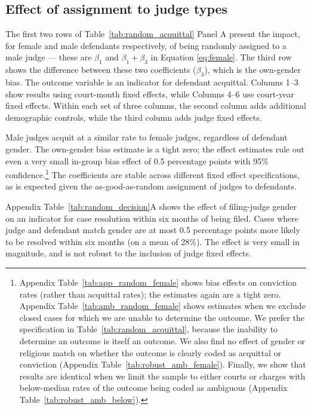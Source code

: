 \documentclass[12pt,english]{article}
\begin{document}
\subsection{Effect of assignment to judge types}

The first two rows of Table~\ref{tab:random_acquittal} Panel A present the impact, for female and male defendants respectively, of being randomly assigned to a male judge --- these are $\beta_1$ and $\beta_1+\beta_3$ in Equation \ref{eq:female}. The third row shows the difference between these two coefficients ($\beta_3$), which is the own-gender bias. The outcome variable is an indicator for defendant acquittal. Columns 1--3 show results using court-month fixed effects, while Columns 4--6 use court-year fixed effects. Within each set of three columns, the second column adds additional demographic controls, while the third column adds judge fixed effects.

Male judges acquit at a similar rate to female judges, regardless of defendant gender. The own-gender bias estimate is a tight zero; the effect estimates rule out even a very small in-group bias effect of 0.5 percentage points with 95\% confidence.\footnote{Appendix Table~\ref{tab:app_random_female} shows bias effects on conviction rates (rather than acquittal rates); the estimates again are a tight zero. Appendix Table~\ref{tab:amb_random_female} shows estimates when we exclude closed cases for which we are unable to determine the outcome. We prefer the specification in Table~\ref{tab:random_acquittal}, because the inability to determine an outcome is itself an outcome. We also find no effect of gender or religious match on whether the outcome is clearly coded as acquittal or conviction (Appendix Table~\ref{tab:robust_amb_female}). Finally, we show that results are identical when we limit the sample to either courts or charges with below-median rates of the outcome being coded as ambiguous (Appendix Table~\ref{tab:robust_amb_below}).} The coefficients are stable across different fixed effect specifications, as is expected given the as-good-as-random assignment of judges to defendants. 

Appendix Table~\ref{tab:random_decision}A shows the effect of filing-judge gender on an indicator for case resolution within six months of being filed. Cases where judge and defendant match gender are at most 0.5 percentage points more likely to be resolved within six months (on a mean of 28\%). The effect is very small in magnitude, and is not robust to the inclusion of judge fixed effects.
\end{document}
